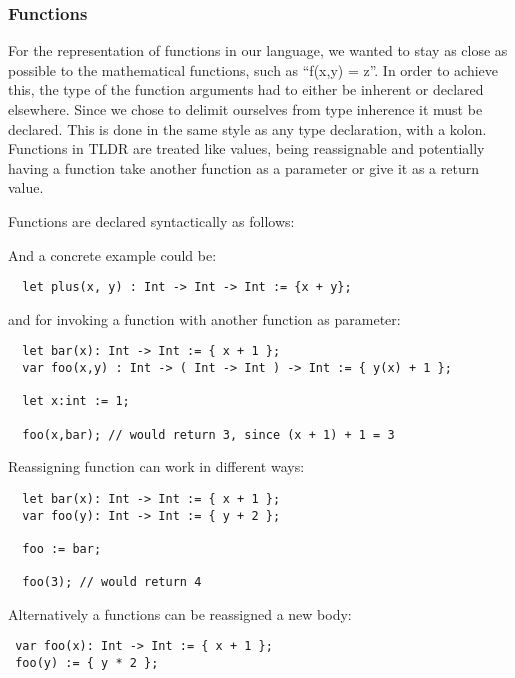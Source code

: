 \subsubsection{Functions}
\label{subsec:functions}

For the representation of functions in our language, we wanted to stay as close as possible to the mathematical functions, such as \enquote{f(x,y) = z}. In order to achieve this, the type of the function arguments had to either be inherent or declared elsewhere. Since we chose to delimit ourselves from type inherence it must be declared. This is done in the same style as any type declaration, with a kolon. Functions in TLDR are treated like values, being reassignable and potentially having a function take another function as a parameter or give it as a return value.

Functions are declared syntactically as follows:


And a concrete example could be:

\begin{verbatim}
  let plus(x, y) : Int -> Int -> Int := {x + y};
\end{verbatim}

and for invoking a function with another function as parameter:

\begin{verbatim}
  let bar(x): Int -> Int := { x + 1 };
  var foo(x,y) : Int -> ( Int -> Int ) -> Int := { y(x) + 1 };

  let x:int := 1;

  foo(x,bar); // would return 3, since (x + 1) + 1 = 3
\end{verbatim}

Reassigning function can work in different ways:

\begin{verbatim}
  let bar(x): Int -> Int := { x + 1 };
  var foo(y): Int -> Int := { y + 2 };

  foo := bar;

  foo(3); // would return 4
\end{verbatim}

Alternatively a functions can be reassigned a new body:

\begin{verbatim}
 var foo(x): Int -> Int := { x + 1 };
 foo(y) := { y * 2 };
\end{verbatim}

